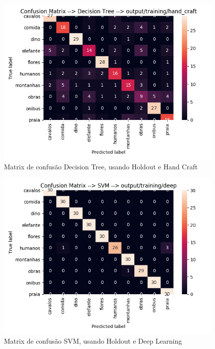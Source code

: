 \documentclass[
article,			%
11pt,				%
oneside,			%
a4paper,			%
english,			%
brazil,				%
sumario=tradicional,
]{abntex2}
\begin{document}
\begin{anexosenv}
	\begin{figure}[htb]
		\caption{\label{confusion-matrix-decision-tree-holdout-hand-craft}Matrix de confusão Decision Tree, usando Holdout e Hand Craft}
		\begin{center}
			\includegraphics[scale=0.5]{confusion-matrix-decision-tree-holdout-hand-craft.png}
		\end{center}
	\end{figure}

	\begin{figure}[htb]
	\caption{\label{confusion-matrix-svm-holdout-deep}Matrix de confusão SVM, usando Holdout e Deep Learning}
	\begin{center}
		\includegraphics[scale=0.5]{confusion-matrix-svm-hodoult-deep.png}
	\end{center}
\end{figure}


\end{anexosenv}
\end{document}

